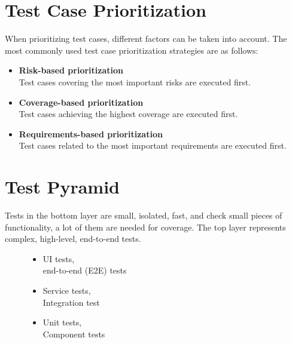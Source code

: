 \documentclass{article}
\begin{document}
\begin{multicols}{3}
{\begin{itemize}
\end{itemize}

\section*{Test Case Prioritization}
When prioritizing test cases, different factors can be taken into account. The most commonly used test case prioritization strategies are as follows:
\begin{itemize}
    \item \textbf{Risk-based prioritization}\\
    Test cases covering the most important risks are executed first.
    
    \item \textbf{Coverage-based prioritization}\\
    Test cases achieving the highest coverage are executed first.
    
    \item \textbf{Requirements-based prioritization}\\
    Test cases related to the most important requirements are executed first.
\end{itemize}

\section*{Test Pyramid}
 Tests in the bottom layer are small, isolated, fast, and check small pieces of functionality, a lot of them are needed for coverage. The top layer represents complex, high-level, end-to-end tests.
\begin{figure}[H]
  \begin{minipage}{0.45\textwidth}
    \centering
    
  \end{minipage}%
  \hspace{0.05\textwidth} %
  \begin{minipage}{0.5\textwidth}
  \raggedright %
\begin{itemize}
\item UI tests,\\ end-to-end (E2E) tests 
\item Service tests,\\ Integration test
\item Unit tests,\\ Component tests
\end{itemize}
  \end{minipage}
\end{figure}

}
\end{multicols}
\end{document}
